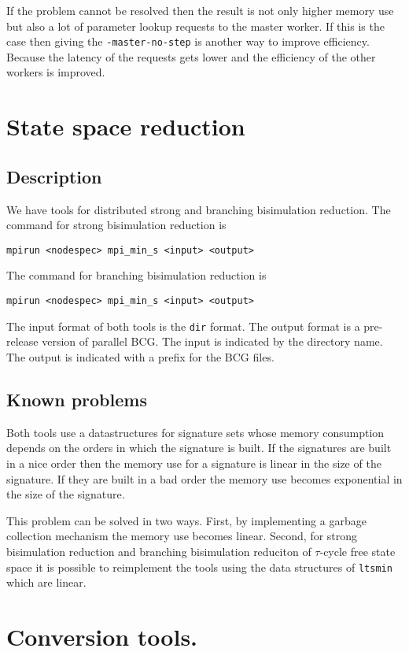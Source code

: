 \documentclass{cwiarticle}
\begin{document}
If the problem cannot be resolved then the result is not only higher memory use but also
a lot of parameter lookup requests to the master worker. If this is the case then giving
the \verb+-master-no-step+ is another way to improve efficiency. Because the latency of the
requests gets lower and the efficiency of the other workers is improved.

\section{State space reduction}

\subsection*{Description}

We have tools for distributed strong and branching bisimulation reduction.
The command for strong bisimulation reduction is
\begin{verbatim}
mpirun <nodespec> mpi_min_s <input> <output>
\end{verbatim}
The command for branching bisimulation reduction is
\begin{verbatim}
mpirun <nodespec> mpi_min_s <input> <output>
\end{verbatim}
The input format of both tools is the \verb+dir+ format.
The output format is a pre-release version of parallel BCG.
The input is indicated by the directory name.
The output is indicated with a prefix for the BCG files.

\subsection*{Known problems}

Both tools use a datastructures for signature sets whose memory consumption
depends on the orders in which the signature is built. If the signatures
are built in a nice order then the memory use for a signature is linear in the size of the
signature. If they are built in a bad order the memory use becomes exponential
in the size of the signature.

This problem can be solved in two ways. First, by implementing a garbage collection mechanism
the memory use becomes linear. Second, for strong bisimulation reduction and branching bisimulation
reduciton of $\tau$-cycle free state space it is possible to reimplement the tools using the
data structures of \verb+ltsmin+ which are linear.

\section{Conversion tools.}
\end{document}
